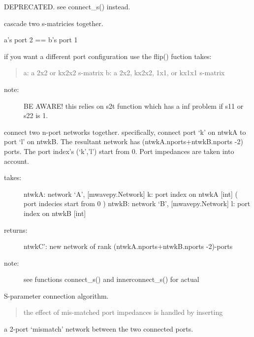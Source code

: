 \documentclass[letterpaper,10pt,english]{sphinxmanual}
\begin{document}

\begin{fulllineitems}
\label{api/mwavepy:mwavepy.network.cascade}
DEPRECATED. see connect\_s() instead.

cascade two s-matricies together.

a's port 2 == b's port 1

if you want a different port configuration use the flip() fuction
takes:
\begin{quote}

a: a 2x2 or kx2x2 s-matrix
b: a 2x2, kx2x2, 1x1, or kx1x1 s-matrix
\end{quote}
\begin{description}
\item[{note:}] \leavevmode
BE AWARE! this relies on s2t function which has a inf problem 
if s11 or s22 is 1.

\end{description}

\end{fulllineitems}


\begin{fulllineitems}
\label{api/mwavepy:mwavepy.network.connect}
connect two n-port networks together. specifically, connect port `k'
on ntwkA to port `l' on ntwkB. The resultant network has
(ntwkA.nports+ntwkB.nports -2) ports. The port index's (`k','l') 
start from 0. Port impedances are taken into account.
\begin{description}
\item[{takes:}] \leavevmode
ntwkA: network `A', {[}mwavepy.Network{]}
k: port index on ntwkA {[}int{]} ( port indecies start from 0 )
ntwkB: network `B', {[}mwavepy.Network{]}
l: port index on ntwkB {[}int{]}

\item[{returns:}] \leavevmode
ntwkC': new network of rank (ntwkA.nports+ntwkB.nports -2)-ports

\item[{note:}] \leavevmode
see functions connect\_s() and innerconnect\_s() for actual

\end{description}

S-parameter connection algorithm.
\begin{quote}

the effect of mis-matched port impedances is handled by inserting
\end{quote}

a 2-port `mismatch' network between the two connected ports.

\end{fulllineitems}
\end{document}
